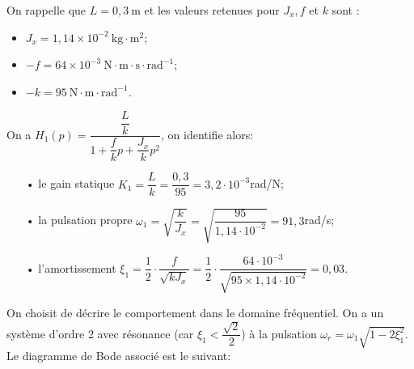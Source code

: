 On rappelle que $L=0,3 \mathrm{~m}$ et les valeurs retenues pour $J_{x}, f$ et $k$ sont :

\begin{itemize}
  \item $J_{x}=1,14 \times 10^{-2} \mathrm{~kg} \cdot \mathrm{m}^{2}$;

  \item $-f=64 \times 10^{-3} \mathrm{~N} \cdot \mathrm{m} \cdot \mathrm{s} \cdot \mathrm{rad}^{-1}$;

  \item $-k=95 \mathrm{~N} \cdot \mathrm{m} \cdot \mathrm{rad}^{-1}$.
\end{itemize}

\ifprof
\begin{corrige}
On a $H_1(p) = \dfrac{\dfrac{L}{k}}{1 + \dfrac{f}{k}p + \dfrac{J_x}{k}p^2}$, on identifie alors:
\begin{itemize}
\item[•] le gain statique $K_1 = \dfrac{L}{k} = \dfrac{0,3}{95} = 3,2\cdot 10^{-3}$rad/N;
\item[•] la pulsation propre $\omega_1 = \sqrt{\dfrac{k}{J_x}} = \sqrt{\dfrac{95}{1,14\cdot 10^{-2}}} = 91,3$rad/s;
\item[•] l'amortissement $\xi_1 = \dfrac{1}{2}\cdot \dfrac{f}{\sqrt{k J_x}} = \dfrac{1}{2}\cdot \dfrac{64\cdot 10^{-3}}{\sqrt{95 \times 1,14\cdot 10^{-2}}} = 0,03$. 
\end{itemize} 

On choisit de décrire le comportement dans le domaine fréquentiel. On a un système d'ordre 2 avec résonance (car $\xi_1 < \dfrac{\sqrt{2}}{2}$) à la pulsation $\omega_r = \omega_1\sqrt{1 - 2\xi_1^2}$. Le diagramme de Bode associé est le suivant:

\end{corrige}
\else
\fi


